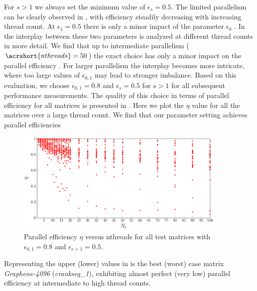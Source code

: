 %
For $s > 1$ we always set the minimum value of $\epsilon_s=0.5$. The limited
parallelism can be clearly observed in , with efficiency
steadily decreasing with increasing thread count. At
$\epsilon_1=0.5$ there is only a minor impact of the parameter
$\epsilon_0$ . In  the interplay
between these two parameters is analyzed at different thread counts in more
detail. We find that up to intermediate parallelism ($\acrshort{nthreads}=50$)
the exact choice has only a minor impact on the parallel efficiency 
. %
For larger parallelism the interplay becomes more intricate,
where too large values of $\epsilon_{0,1}$ may lead to stronger imbalance. Based
on this evaluation, we choose $\epsilon_{0,1}=0.8$ and $\epsilon_s=0.5$ for $s>1$
for all subsequent performance measurements. The quality of this choice in terms of
parallel efficiency for all matrices is presented
in . Here we plot the $\eta$ value for all the
matrices over a large thread count. We find that our parameter setting achieves
parallel efficiencies 
   \begin{figure}[t]
   	\centering
   	\includegraphics[width=0.9\textwidth]{pics/param_study/scatter_plot}
   	\caption{Parallel efficiency $\eta$ versus \acrshort{nthreads} for all test matrices with $\epsilon_{0,1} = 0.8$ and $\epsilon_{s>1} = 0.5$.}
  	\label{fig:param_all_mtx_stat}
   \end{figure}
Representing the upper (lower) values in  is the
best (worst) case matrix \emph{Graphene-4096} (\emph{crankseg\_1}), exhibiting
almost perfect (very low) parallel efficiency at intermediate to high thread
counts.

